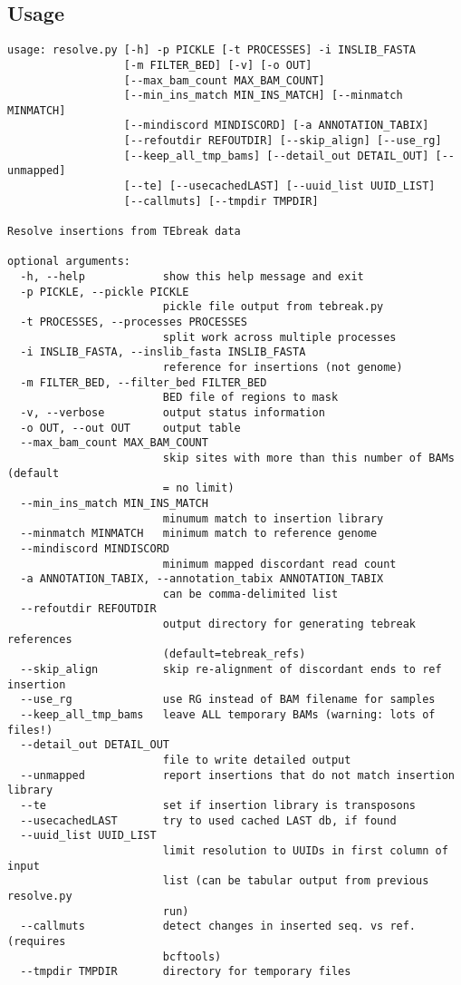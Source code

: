 \documentclass[letterpaper,11pt]{article}
\begin{document}
\subsection{Usage}
\begin{verbatim}
usage: resolve.py [-h] -p PICKLE [-t PROCESSES] -i INSLIB_FASTA
                  [-m FILTER_BED] [-v] [-o OUT]
                  [--max_bam_count MAX_BAM_COUNT]
                  [--min_ins_match MIN_INS_MATCH] [--minmatch MINMATCH]
                  [--mindiscord MINDISCORD] [-a ANNOTATION_TABIX]
                  [--refoutdir REFOUTDIR] [--skip_align] [--use_rg]
                  [--keep_all_tmp_bams] [--detail_out DETAIL_OUT] [--unmapped]
                  [--te] [--usecachedLAST] [--uuid_list UUID_LIST]
                  [--callmuts] [--tmpdir TMPDIR]

Resolve insertions from TEbreak data

optional arguments:
  -h, --help            show this help message and exit
  -p PICKLE, --pickle PICKLE
                        pickle file output from tebreak.py
  -t PROCESSES, --processes PROCESSES
                        split work across multiple processes
  -i INSLIB_FASTA, --inslib_fasta INSLIB_FASTA
                        reference for insertions (not genome)
  -m FILTER_BED, --filter_bed FILTER_BED
                        BED file of regions to mask
  -v, --verbose         output status information
  -o OUT, --out OUT     output table
  --max_bam_count MAX_BAM_COUNT
                        skip sites with more than this number of BAMs (default
                        = no limit)
  --min_ins_match MIN_INS_MATCH
                        minumum match to insertion library
  --minmatch MINMATCH   minimum match to reference genome
  --mindiscord MINDISCORD
                        minimum mapped discordant read count
  -a ANNOTATION_TABIX, --annotation_tabix ANNOTATION_TABIX
                        can be comma-delimited list
  --refoutdir REFOUTDIR
                        output directory for generating tebreak references
                        (default=tebreak_refs)
  --skip_align          skip re-alignment of discordant ends to ref insertion
  --use_rg              use RG instead of BAM filename for samples
  --keep_all_tmp_bams   leave ALL temporary BAMs (warning: lots of files!)
  --detail_out DETAIL_OUT
                        file to write detailed output
  --unmapped            report insertions that do not match insertion library
  --te                  set if insertion library is transposons
  --usecachedLAST       try to used cached LAST db, if found
  --uuid_list UUID_LIST
                        limit resolution to UUIDs in first column of input
                        list (can be tabular output from previous resolve.py
                        run)
  --callmuts            detect changes in inserted seq. vs ref. (requires
                        bcftools)
  --tmpdir TMPDIR       directory for temporary files

\end{verbatim}
\end{document}
